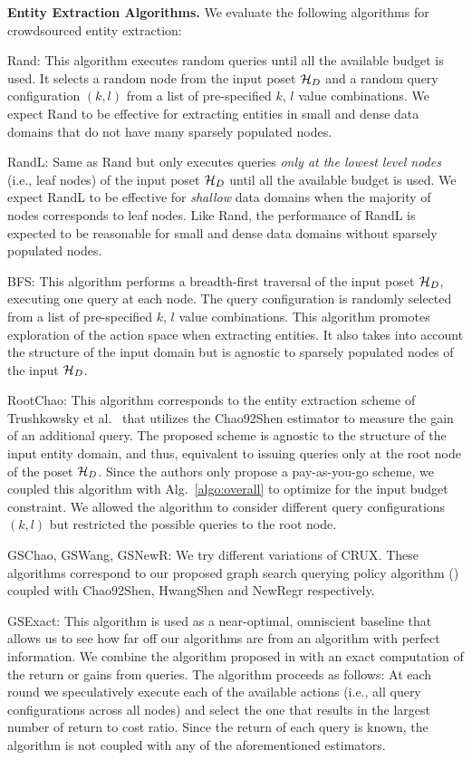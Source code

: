\vspace{5pt}\noindent\textbf{Entity Extraction Algorithms.} We evaluate the following algorithms for crowdsourced entity extraction:
\squishlist
\item Rand: This algorithm executes random queries until all the available budget is used. It selects a random node from the input poset $\mathcal{H}_D$ and a random query configuration $(k,l)$ from a list of pre-specified $k$, $l$ value combinations. \iftr We expect Rand to be effective for extracting entities in small and dense data domains that do not have many sparsely populated nodes. \fi
\item RandL: Same as Rand but only executes queries {\em only at the lowest level nodes} (i.e., leaf nodes) of the input poset $\mathcal{H}_D$ until all the available budget is used.  \iftr We expect RandL to be effective for {\em shallow} data domains when the majority of nodes corresponds to leaf nodes. Like Rand, the performance of RandL is expected to be reasonable for small and dense data domains without sparsely populated nodes.\fi
\item BFS: This algorithm performs a breadth-first traversal of the input poset $\mathcal{H}_D$, executing one query at each node. The query configuration is randomly selected from a list of pre-specified $k$, $l$ value combinations. This algorithm promotes exploration of the action space when extracting entities. \iftr It also takes into account the structure of the input domain but is agnostic to sparsely populated nodes of the input $\mathcal{H}_D$. \fi
\item RootChao: This algorithm corresponds to the entity extraction scheme of Trushkowsky et al.~\cite{trushkowsky:2013} that utilizes the Chao92Shen estimator to measure the gain of an additional query. The proposed scheme is agnostic to the structure of the input entity domain, and thus, equivalent to issuing queries only at the root node of the poset $\mathcal{H}_D$. Since the authors only propose a pay-as-you-go scheme, we coupled this algorithm with Alg.~\ref{algo:overall} to optimize for the input budget constraint. We allowed the algorithm to consider different query configurations $(k,l)$ but restricted the possible queries to the root node.
\item GSChao, GSWang, GSNewR: We try different variations of CRUX. These algorithms correspond to our proposed graph search querying policy algorithm () coupled with Chao92Shen, HwangShen and NewRegr respectively.
\item GSExact: This algorithm is used as a near-optimal, omniscient baseline that allows us to see how far off our algorithms are from an algorithm with perfect information. We combine the algorithm proposed in  with an exact computation of the return or gains from queries. The algorithm proceeds as follows: At each round we speculatively execute each of the available actions (i.e., all query configurations across all nodes) and select the one that results in the largest number of return to cost ratio. Since the return of each query is known, the algorithm is not coupled with any of the aforementioned estimators.
\squishend

